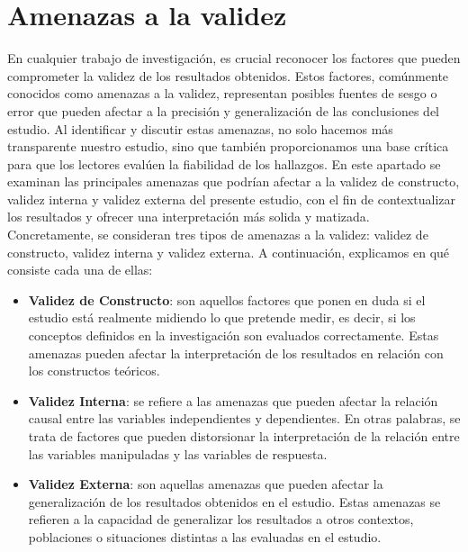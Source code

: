 \section{Amenazas a la validez}
En cualquier trabajo de investigación, es crucial reconocer los factores que pueden comprometer
la validez de los resultados obtenidos. Estos factores, comúnmente conocidos como amenazas a la
validez, representan posibles fuentes de sesgo o error que pueden afectar a la precisión y
generalización de las conclusiones del estudio. Al identificar y discutir estas amenazas, no solo
hacemos más transparente nuestro estudio, sino que también proporcionamos una base crítica para
que los lectores evalúen la fiabilidad de los hallazgos. En este apartado se examinan las
principales amenazas que podrían afectar a la validez de constructo, validez interna y validez
externa del presente estudio, con el fin de contextualizar los resultados y ofrecer una
interpretación más solida y matizada.\\

Concretamente, se consideran tres tipos de amenazas a la validez: validez de constructo, validez
interna y validez externa. A continuación, explicamos en qué consiste cada una de ellas:

\begin{itemize}
    \item \textbf{Validez de Constructo}: son aquellos factores que ponen en duda si el estudio
    está realmente midiendo lo que pretende medir, es decir, si los conceptos definidos en la
    investigación son evaluados correctamente. Estas amenazas pueden afectar la interpretación
    de los resultados en relación con los constructos teóricos.\\

    \item \textbf{Validez Interna}: se refiere a las amenazas que pueden afectar la relación
    causal entre las variables independientes y dependientes. En otras palabras, se trata de
    factores que pueden distorsionar la interpretación de la relación entre las variables
    manipuladas y las variables de respuesta.\\

    \item \textbf{Validez Externa}: son aquellas amenazas que pueden afectar la generalización de
    los resultados obtenidos en el estudio. Estas amenazas se refieren a la capacidad de
    generalizar los resultados a otros contextos, poblaciones o situaciones distintas a las
    evaluadas en el estudio.
\end{itemize}

